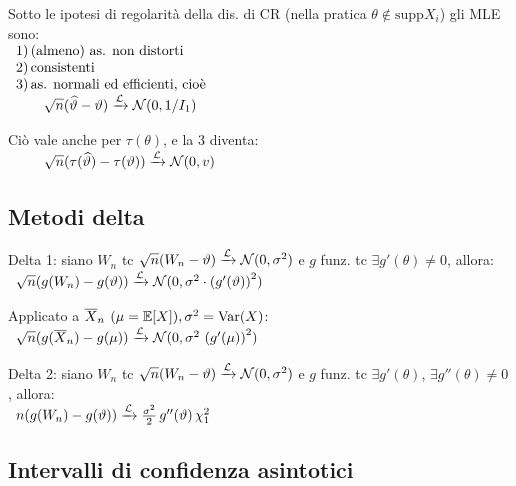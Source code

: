Sotto le ipotesi di regolarità della dis. di CR (nella pratica $\theta\notin\text{supp}X_i$) gli MLE sono: \\
$\begin{array}{l}
1)\,\text{(almeno) as. non distorti} \\
2)\,\text{consistenti} \\
3)\,\text{as. normali ed efficienti, cioè} \\
\qquad \sqrt{n}(\widehat{\vartheta}-\vartheta)\xrightarrow{\mathcal{L}}\mathcal{N}(0,1/I_1) \\
\end{array}$

Ciò vale anche per $\tau(\theta)$, e la 3 diventa: \\
$\begin{array}{l}
\qquad \sqrt{n}(\tau(\widehat{\vartheta})-\tau(\vartheta))\xrightarrow{\mathcal{L}}\mathcal{N}(0,v)
\end{array}$

\subsection{Metodi delta}

Delta 1: siano $W_n$ tc $\sqrt{n}(W_n-\vartheta)\xrightarrow{\mathcal{L}}\mathcal{N}(0,\sigma^2)$ e $g$ funz. tc $\exists g'(\theta)\neq 0$, allora: \\
$\begin{array}{c}
\sqrt{n}(g(W_n)-g(\vartheta))\xrightarrow{\mathcal{L}}\mathcal{N}(0,\sigma^2\cdot\left(g'(\vartheta)\right)^2)
\end{array}$

\smallskip

Applicato a $\overline{X}_n$ $(\mu=\mathbb{E}[X]),\sigma^2=\operatorname{Var}(X)$: \\
$\begin{array}{l}
\sqrt{n}(g(\overline{X}_n)-g(\mu))\xrightarrow{\mathcal{L}}\mathcal{N}(0,\sigma^2\,\left(g'(\mu)\right)^2)
\end{array}$

\smallskip

Delta 2: siano $W_n$ tc $\sqrt{n}(W_n-\vartheta)\xrightarrow{\mathcal{L}}\mathcal{N}(0,\sigma^2)$ e $g$ funz. tc $\exists g'(\theta)$, $\exists g''(\theta)\neq 0$, allora: \\
$\begin{array}{l}
n(g(W_n)-g(\vartheta))\xrightarrow{\mathcal{L}} \frac{\sigma^2}{2}\,g''(\vartheta)\,\chi^2_1
\end{array}$

\subsection{Intervalli di confidenza asintotici}


